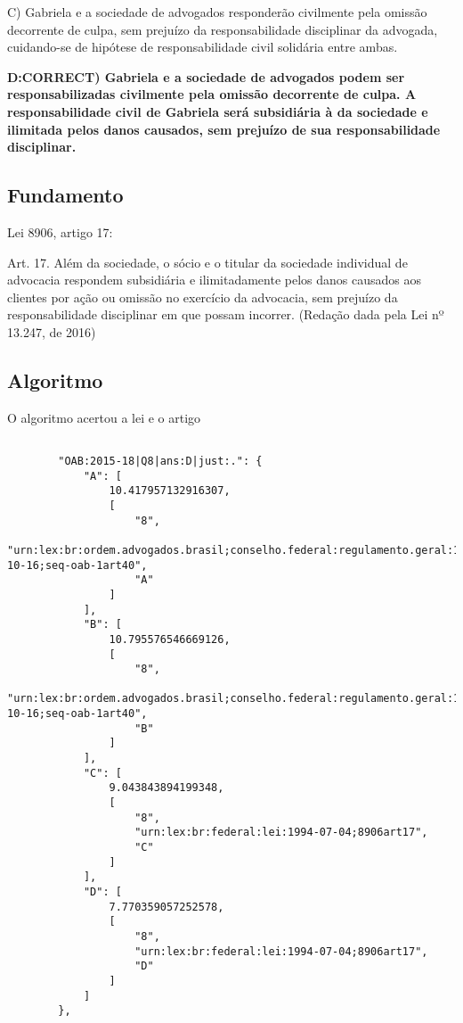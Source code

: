 \documentclass[12pt]{article}
\begin{document}
C) Gabriela e a sociedade de advogados responderão 
civilmente pela omissão decorrente de culpa, sem prejuízo 
da responsabilidade disciplinar da advogada, cuidando-se 
de hipótese de responsabilidade civil solidária entre 
ambas. 

\textbf{D:CORRECT) Gabriela e a sociedade de advogados podem ser responsabilizadas civilmente pela omissão decorrente de 
culpa. A responsabilidade civil de Gabriela será subsidiária 
à da sociedade e ilimitada pelos danos causados, sem 
prejuízo de sua responsabilidade disciplinar. }

\subsection{Fundamento}

Lei 8906, artigo 17:

Art. 17.  Além da sociedade, o sócio e o titular da sociedade individual de advocacia respondem subsidiária e ilimitadamente pelos danos causados aos clientes por ação ou omissão no exercício da advocacia, sem prejuízo da responsabilidade disciplinar em que possam incorrer.               (Redação dada pela Lei nº 13.247, de 2016)

\subsection{Algoritmo}

O algoritmo acertou a lei e o artigo

\begin{lstlisting}

        "OAB:2015-18|Q8|ans:D|just:.": {
            "A": [
                10.417957132916307,
                [
                    "8",
                    "urn:lex:br:ordem.advogados.brasil;conselho.federal:regulamento.geral:1994-10-16;seq-oab-1art40",
                    "A"
                ]
            ],
            "B": [
                10.795576546669126,
                [
                    "8",
                    "urn:lex:br:ordem.advogados.brasil;conselho.federal:regulamento.geral:1994-10-16;seq-oab-1art40",
                    "B"
                ]
            ],
            "C": [
                9.043843894199348,
                [
                    "8",
                    "urn:lex:br:federal:lei:1994-07-04;8906art17",
                    "C"
                ]
            ],
            "D": [
                7.770359057252578,
                [
                    "8",
                    "urn:lex:br:federal:lei:1994-07-04;8906art17",
                    "D"
                ]
            ]
        },
        
\end{lstlisting}




\end{document}
